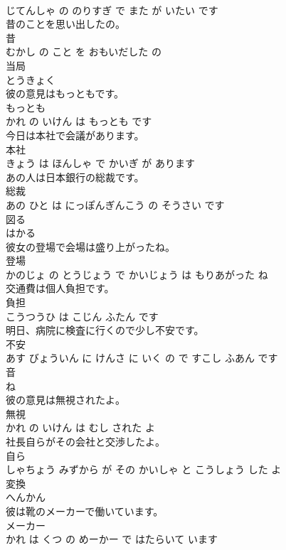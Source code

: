 \documentclass[8pt]{extreport}
\begin{document}
\begin{CJK}{UTF8}{min}
\\	じてんしゃ の のりすぎ で また が いたい です			
\\	昔のことを思い出したの。	
\\	昔 
\\	むかし の こと を おもいだした の			
\\	当局	
\\	とうきょく			
\\	彼の意見はもっともです。	
\\	もっとも 
\\	かれ の いけん は もっとも です			
\\	今日は本社で会議があります。	
\\	本社 
\\	きょう は ほんしゃ で かいぎ が あります			
\\	あの人は日本銀行の総裁です。	
\\	総裁 
\\	あの ひと は にっぽんぎんこう の そうさい です			
\\	図る	
\\	はかる			
\\	彼女の登場で会場は盛り上がったね。	
\\	登場 
\\	かのじょ の とうじょう で かいじょう は もりあがった ね			
\\	交通費は個人負担です。	
\\	負担 
\\	こうつうひ は こじん ふたん です			
\\	明日、病院に検査に行くので少し不安です。	
\\	不安 
\\	あす びょういん に けんさ に いく の で すこし ふあん です			
\\	音	
\\	ね			
\\	彼の意見は無視されたよ。	
\\	無視 
\\	かれ の いけん は むし された よ			
\\	社長自らがその会社と交渉したよ。	
\\	自ら 
\\	しゃちょう みずから が その かいしゃ と こうしょう した よ			
\\	変換	
\\	へんかん			
\\	彼は靴のメーカーで働いています。	
\\	メーカー 
\\	かれ は くつ の めーかー で はたらいて います			

\end{CJK}
\end{document}
